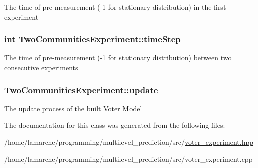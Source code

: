 The time of pre-\/measurement (-\/1 for stationary distribution) in the first experiment \hypertarget{class_two_communities_experiment_a06a819e995ff4f8593202ef6a425175b}{
\subsubsection[{time\-Step}]{\setlength{\rightskip}{0pt plus 5cm}int Two\-Communities\-Experiment\-::time\-Step}}\label{class_two_communities_experiment_a06a819e995ff4f8593202ef6a425175b}
The time of pre-\/measurement (-\/1 for stationary distribution) between two consecutive experiments \hypertarget{class_two_communities_experiment_ad72f8a79b28ad213d7d050c5acc0272f}{
\subsubsection[{update}]{ Two\-Communities\-Experiment\-::update}}\label{class_two_communities_experiment_ad72f8a79b28ad213d7d050c5acc0272f}
The update process of the built Voter Model 

The documentation for this class was generated from the following files\-:\begin{DoxyCompactItemize}
\item 
/home/lamarche/programming/multilevel\-\_\-prediction/src/\hyperlink{voter__experiment_8hpp}{voter\-\_\-experiment.\-hpp}\item 
/home/lamarche/programming/multilevel\-\_\-prediction/src/voter\-\_\-experiment.\-cpp\end{DoxyCompactItemize}
